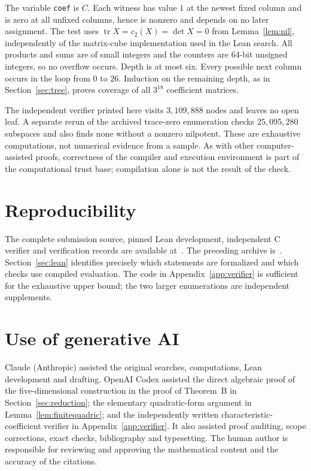 \documentclass[screen]{aomart}
\theoremstyle{definition}
\theoremstyle{remark}
\numberwithin{equation}{section}
\newcommand{\tr}{\operatorname{tr}}
\begin{document}
The variable \texttt{coef} is $C$. Each witness has value $1$ at the newest fixed column and is zero at all unfixed columns, hence is nonzero and depends on no later assignment. The test uses $\tr X=c_2(X)=\det X=0$ from Lemma~\ref{lem:nil}, independently of the matrix-cube implementation used in the Lean search. All products and sums are of small integers and the counters are 64-bit unsigned integers, so no overflow occurs. Depth is at most six. Every possible next column occurs in the loop from $0$ to $26$. Induction on the remaining depth, as in Section~\ref{sec:tree}, proves coverage of all $3^{18}$ coefficient matrices.

The independent verifier printed here visits $3{,}109{,}888$ nodes and leaves no open leaf. A separate rerun of the archived trace-zero enumeration checks $25{,}095{,}280$ subspaces and also finds none without a nonzero nilpotent. These are exhaustive computations, not numerical evidence from a sample. As with other computer-assisted proofs, correctness of the compiler and execution environment is part of the computational trust base; compilation alone is not the result of the check.




\section*{Reproducibility}
The complete submission source, pinned Lean development, independent C verifier and verification records are available at~\cite{Revision}. The preceding archive is~\cite{Ar}. Section~\ref{sec:lean} identifies precisely which statements are formalized and which checks use compiled evaluation. The code in Appendix~\ref{app:verifier} is sufficient for the exhaustive upper bound; the two larger enumerations are independent supplements.

\section*{Use of generative AI}
Claude (Anthropic) assisted the original searches, computations, Lean development and drafting. OpenAI Codex assisted the direct algebraic proof of the five-dimensional construction in the proof of Theorem~B in Section~\ref{sec:reduction}; the elementary quadratic-form argument in Lemma~\ref{lem:finitequadric}; and the independently written characteristic-coefficient verifier in Appendix~\ref{app:verifier}. It also assisted proof auditing, scope corrections, exact checks, bibliography and typesetting. The human author is responsible for reviewing and approving the mathematical content and the accuracy of the citations.



\end{document}
